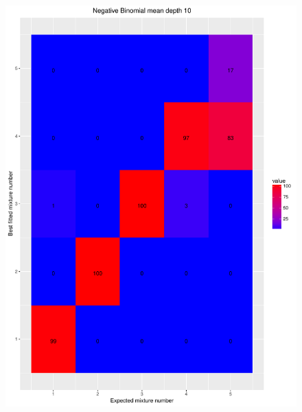 \documentclass[11pt]{article}
\begin{document}
\begin{figure}[H]
\begin{center}
\includegraphics[scale=0.27]{../Results/Second_Analysis/Negative_Binomial_Confusion_Matrix_10.pdf}

\end{center}
\end{figure}
\end{document}
